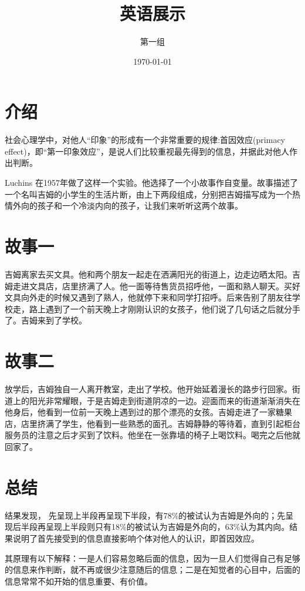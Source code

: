 \documentclass[UTF8]{ctexart}
\title{英语展示}
\author{第一组}
\date{\today}
\begin{document}
	\maketitle
	\section{介绍}
	社会心理学中，对他人“印象”的形成有一个非常重要的规律:首因效应(primacy
	effect)，即“第一印象效应”，是说人们比较重视最先得到的信息，并据此对他人作出判断。

	Luchins 在1957年做了这样一个实验。他选择了一个小故事作自变量。故事描述了一个名叫吉姆的小学生的生活片断，由上下两段组成，分别把吉姆描写成为一个热情外向的孩子和一个冷淡内向的孩子，让我们来听听这两个故事。
	\section{故事一}
	吉姆离家去买文具。他和两个朋友一起走在洒满阳光的街道上，边走边晒太阳。吉姆走进文具店，店里挤满了人。他一面等待售货员招呼他，一面和熟人聊天。买好文具向外走的时候又遇到了熟人，他就停下来和同学打招呼。后来告别了朋友往学校走，路上遇到了一个前天晚上才刚刚认识的女孩子，他们说了几句话之后就分手了。吉姆来到了学校。
	\section{故事二}
	放学后，吉姆独自一人离开教室，走出了学校。他开始延着漫长的路步行回家。街道上的阳光非常耀眼，于是吉姆走到街道阴凉的一边。迎面而来的街道渐渐消失在他身后，他看到一位前一天晚上遇到过的那个漂亮的女孩。吉姆走进了一家糖果店，店里挤满了学生，他看到一些熟悉的面孔。吉姆静静的等待着，直到引起柜台服务员的注意之后才买到了饮料。他坐在一张靠墙的椅子上喝饮料。喝完之后他就回家了。
	\section{总结}
	结果发现， 先呈现上半段再呈现下半段，有78\%的被试认为吉姆是外向的；先呈现后半段再呈现上半段则只有18\%的被试认为吉姆是外向的，63\%认为其内向。结果说明了首先接受到的信息直接影响个体对他人的认识，即首因效应。
	
	其原理有以下解释：一是人们容易忽略后面的信息，因为一旦人们觉得自己有足够的信息来作判断，就不再或很少注意随后的信息；二是在知觉者的心目中，后面的信息常常不如开始的信息重要、有价值。
	
\end{document}
